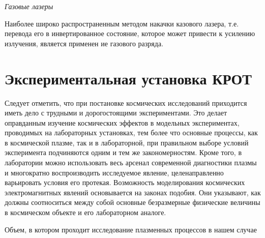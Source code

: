 \textit{Газовые лазеры}

Наиболее широко распространенным методом накачки казового лазера, т.е. перевода его в инвертированное состояние, которое может привести к усилению излучения, является применен
ие газового разряда.




\section{Экспериментальная установка КРОТ} %

Следует отметить, что при постановке космических исследований приходится иметь дело с трудными и дорогостоящими экспериментами. Это делает оправданным изучение космических эффектов в модельных экспериментах, проводимых на лабораторных установках, тем более что основные процессы, как в космической плазме, так и в лабораторной, при правильном выборе условий эксперимента подчиняются одним и тем же закономерностям. Кроме того, в лаборатории можно использовать весь арсенал современной диагностики плазмы и многократно воспроизводить исследуемое явление, целенаправленно варьировать условия его протекая. Возможность моделирования космических электромагнитных явлений основывается на законах подобия. Они указывают, как должны соотноситься между собой основные безразмерные физические величины в космическом объекте и его лабораторном аналоге. 

Объем, в котором проходит исследование плазменных процессов в нашем случае


